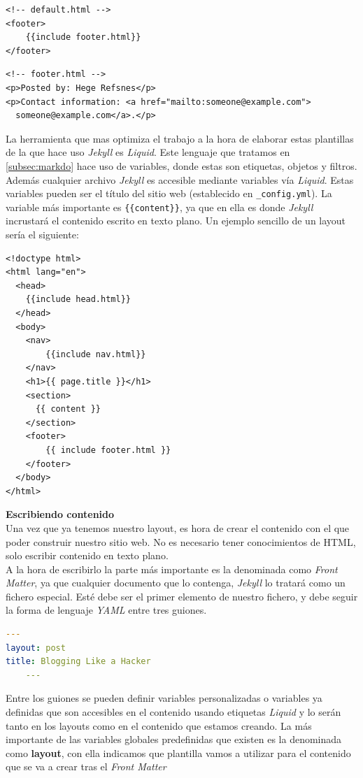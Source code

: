 \begin{lstlisting}[style=htmlcssjs,caption=default.html]
<!-- default.html -->
<footer>
    {{include footer.html}}
</footer>
\end{lstlisting}
\begin{lstlisting}[style=htmlcssjs,caption=footer.html]
<!-- footer.html -->
<p>Posted by: Hege Refsnes</p>
<p>Contact information: <a href="mailto:someone@example.com">
  someone@example.com</a>.</p>
\end{lstlisting}
La herramienta que mas optimiza el trabajo a la hora de elaborar estas plantillas de la que hace uso \emph{Jekyll} es \emph{Liquid}. Este lenguaje que tratamos  en \ref{subsec:markdo} hace uso de variables, donde estas son etiquetas, objetos y filtros. Además cualquier archivo \emph{Jekyll} es accesible mediante variables vía \emph{Liquid}. Estas variables pueden ser el título del sitio web (establecido en \texttt{\_config.yml}). La variable más importante es \texttt{\{\{content\}\}}, ya que en ella es donde \emph{Jekyll} incrustará el contenido escrito en texto plano. Un ejemplo sencillo de un layout sería el siguiente:
\begin{lstlisting}[style=htmlcssjs,caption=Layout Básico]
<!doctype html>
<html lang="en">
  <head>
    {{include head.html}}
  </head>
  <body>
    <nav>
        {{include nav.html}}
    </nav>
    <h1>{{ page.title }}</h1>
    <section>
      {{ content }}
    </section>
    <footer>
        {{ include footer.html }}
    </footer>
  </body>
</html>
\end{lstlisting}
\textbf{\large{Escribiendo contenido}} \\
Una vez que ya tenemos nuestro layout, es hora de crear el contenido con el que poder construir nuestro sitio web. No es necesario tener conocimientos de HTML, solo escribir contenido en texto plano. \\
A la hora de escribirlo la parte más importante es la denominada como \emph{Front Matter}, ya que cualquier documento que lo contenga, \emph{Jekyll} lo tratará como un fichero especial. Esté debe ser el primer elemento de nuestro fichero, y debe seguir la forma de lenguaje \emph{YAML} entre tres guiones.
\begin{lstlisting}[language=yaml,caption=Ejemplo de Front Matter]
    ---
layout: post
title: Blogging Like a Hacker
    ---
\end{lstlisting}
Entre los guiones se pueden definir variables personalizadas  o variables ya definidas que son accesibles en el contenido usando etiquetas \emph{Liquid} y lo serán tanto en los layouts como en el contenido que estamos creando. La más importante de las variables globales predefinidas que existen es la denominada como \textbf{layout}, con ella indicamos que plantilla vamos a utilizar para el contenido que se va a crear tras el \emph{Front Matter} \\
